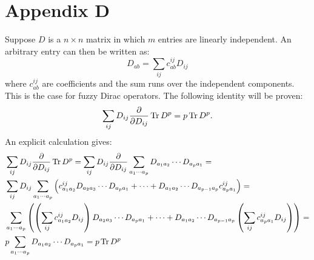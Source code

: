 \section*{Appendix D}
Suppose $D$ is a $n \times n$ matrix in which $m$ entries are linearly independent. An arbitrary entry can then be written as:
\begin{equation}
D_{ab} = \sum_{ij} c^{ij}_{ab} D_{ij}
\end{equation}
where $c^{ij}_{ab}$ are coefficients and the sum runs over the independent components. This is the case for fuzzy Dirac operators.\newline
The following identity will be proven:
\begin{equation}
\sum_{ij} D_{ij} \frac{\partial}{\partial D_{ij}} \operatorname{Tr} D^p = p \operatorname{Tr} D^p.
\end{equation}
An explicit calculation gives:
\begin{align}
&\sum_{ij} D_{ij} \frac{\partial}{\partial D_{ij}} \operatorname{Tr} D^p = \sum_{ij} D_{ij} \frac{\partial}{\partial D_{ij}} \sum_{a_1 \cdots a_p} D_{a_1 a_2} \cdots D_{a_p a_1} = \\ \notag
&\sum_{ij} D_{ij} \sum_{a_1 \cdots a_p} \left( c^{ij}_{a_1 a_2} D_{a_2 a_3} \cdots D_{a_p a_1} + \cdots + D_{a_1 a_2} \cdots D_{a_{p-1} a_p} c^{ij}_{a_p a_1} \right) = \\ \notag
&\sum_{a_1 \cdots a_p} \left( \left(\sum_{ij} c^{ij}_{a_1 a_2} D_{ij}\right) D_{a_2 a_3} \cdots D_{a_p a_1} + \cdots + D_{a_1 a_2} \cdots D_{a_{p-1} a_p} \left( \sum_{ij} c^{ij}_{a_p a_1} D_{ij} \right) \right) = \\ \notag
&p \sum_{a_1 \cdots a_p} D_{a_1 a_2} \cdots D_{a_p a_1} = p \operatorname{Tr} D^p 
\end{align}